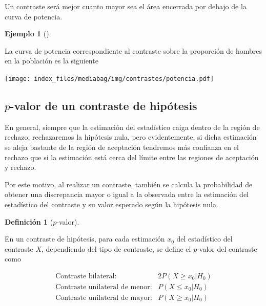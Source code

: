 \documentclass[
  a4paper,
]{scrreport}
\theoremstyle{plain}
\theoremstyle{definition}
\newtheorem{example}{Ejemplo}[chapter]
\theoremstyle{definition}
\newtheorem{definition}{Definición}[chapter]
\theoremstyle{remark}
\begin{document}
Un contraste será mejor cuanto mayor sea el área encerrada por debajo de
la curva de potencia.

\begin{example}[]\protect\hypertarget{exm-curva-potencia}{}\label{exm-curva-potencia}

La curva de potencia correspondiente al contraste sobre la proporción de
hombres en la población es la siguiente

\begin{center}
\texttt{[image: index\_files/mediabag/img/contrastes/potencia.pdf]}
\end{center}

\end{example}

\subsection{\texorpdfstring{\(p\)-valor de un contraste de
hipótesis}{p-valor de un contraste de hipótesis}}\label{p-valor-de-un-contraste-de-hipuxf3tesis}

En general, siempre que la estimación del estadístico caiga dentro de la
región de rechazo, rechazaremos la hipótesis nula, pero evidentemente,
si dicha estimación se aleja bastante de la región de aceptación
tendremos más confianza en el rechazo que si la estimación está cerca
del límite entre las regiones de aceptación y rechazo.

Por este motivo, al realizar un contraste, también se calcula la
probabilidad de obtener una discrepancia mayor o igual a la observada
entre la estimación del estadístico del contraste y su valor esperado
según la hipótesis nula.

\begin{definition}[\(p\)-valor]\protect\hypertarget{def-p-valor}{}\label{def-p-valor}

En un contraste de hipótesis, para cada estimación \(x_0\) del
estadístico del contraste \(X\), dependiendo del tipo de contraste, se
define el \(p\)-valor del contraste como

\[
\begin{array}{lc}
\mbox{Contraste bilateral}: & 2P(X\geq x_0|H_0) \\
\mbox{Contraste unilateral de menor}: & P(X\leq x_0|H_0) \\
\mbox{Contraste unilateral de mayor}: & P(X\geq x_0|H_0)
\end{array}
\]

\end{definition}
\end{document}
